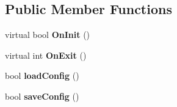\subsection*{Public Member Functions}
\begin{DoxyCompactItemize}
\item 
\hypertarget{class_main_app_aff3d398e1b61f1016c37d57798f86731}{virtual bool {\bfseries On\-Init} ()}\label{class_main_app_aff3d398e1b61f1016c37d57798f86731}

\item 
\hypertarget{class_main_app_a7fcdb66d2268e47420a4a234808cf321}{virtual int {\bfseries On\-Exit} ()}\label{class_main_app_a7fcdb66d2268e47420a4a234808cf321}

\item 
\hypertarget{class_main_app_af06cc098b89d1c606aa94ad87d6b0105}{bool {\bfseries load\-Config} ()}\label{class_main_app_af06cc098b89d1c606aa94ad87d6b0105}

\item 
\hypertarget{class_main_app_a620a6b1b271571cc10b8f36e45bfcd7e}{bool {\bfseries save\-Config} ()}\label{class_main_app_a620a6b1b271571cc10b8f36e45bfcd7e}

\end{DoxyCompactItemize}
